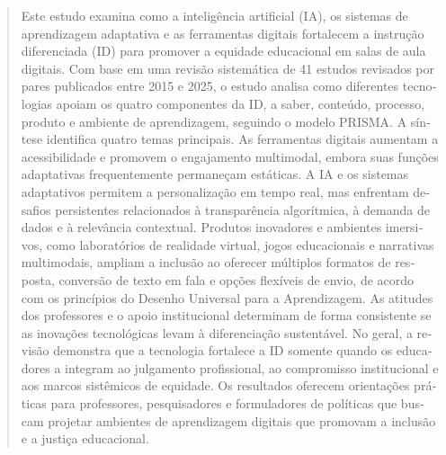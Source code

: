 \documentclass[english]{textolivre}
\begin{document}
\begin{polyabstract}
\begin{portuguese}
\begin{abstract}
Este estudo examina como a inteligência artificial (IA), os sistemas de aprendizagem adaptativa e as ferramentas digitais fortalecem a instrução diferenciada (ID) para promover a equidade educacional em salas de aula digitais. Com base em uma revisão sistemática de 41 estudos revisados por pares publicados entre 2015 e 2025, o estudo analisa como diferentes tecnologias apoiam os quatro componentes da ID, a saber, conteúdo, processo, produto e ambiente de aprendizagem, seguindo o modelo PRISMA. A síntese identifica quatro temas principais. As ferramentas digitais aumentam a acessibilidade e promovem o engajamento multimodal, embora suas funções adaptativas frequentemente permaneçam estáticas. A IA e os sistemas adaptativos permitem a personalização em tempo real, mas enfrentam desafios persistentes relacionados à transparência algorítmica, à demanda de dados e à relevância contextual. Produtos inovadores e ambientes imersivos, como laboratórios de realidade virtual, jogos educacionais e narrativas multimodais, ampliam a inclusão ao oferecer múltiplos formatos de resposta, conversão de texto em fala e opções flexíveis de envio, de acordo com os princípios do Desenho Universal para a Aprendizagem. As atitudes dos professores e o apoio institucional determinam de forma consistente se as inovações tecnológicas levam à diferenciação sustentável. No geral, a revisão demonstra que a tecnologia fortalece a ID somente quando os educadores a integram ao julgamento profissional, ao compromisso institucional e aos marcos sistêmicos de equidade. Os resultados oferecem orientações práticas para professores, pesquisadores e formuladores de políticas que buscam projetar ambientes de aprendizagem digitais que promovam a inclusão e a justiça educacional.


\end{abstract}
\end{portuguese}
\end{polyabstract}
\end{document}
